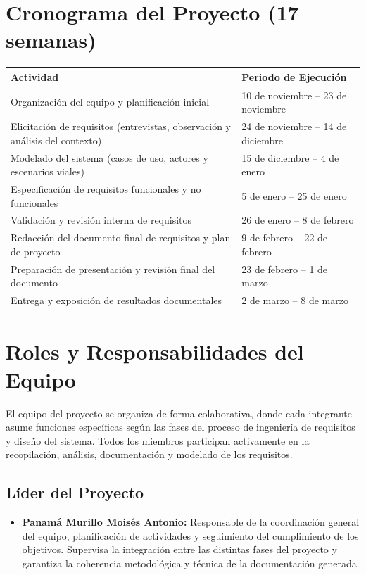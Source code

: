 \documentclass[12pt]{article}
\begin{document}
\section{Cronograma del Proyecto (17 semanas)}
\begin{longtable}{|p{10cm}|p{5cm}|}
\hline
\textbf{Actividad} & \textbf{Periodo de Ejecución} \\ \hline
Organización del equipo y planificación inicial & 10 de noviembre -- 23 de noviembre \\ \hline
Elicitación de requisitos (entrevistas, observación y análisis del contexto) & 24 de noviembre -- 14 de diciembre \\ \hline
Modelado del sistema (casos de uso, actores y escenarios viales) & 15 de diciembre -- 4 de enero \\ \hline
Especificación de requisitos funcionales y no funcionales & 5 de enero -- 25 de enero \\ \hline
Validación y revisión interna de requisitos & 26 de enero -- 8 de febrero \\ \hline
Redacción del documento final de requisitos y plan de proyecto & 9 de febrero -- 22 de febrero \\ \hline
Preparación de presentación y revisión final del documento & 23 de febrero -- 1 de marzo \\ \hline
Entrega y exposición de resultados documentales & 2 de marzo -- 8 de marzo \\ \hline
\end{longtable}

\section{Roles y Responsabilidades del Equipo}

El equipo del proyecto se organiza de forma colaborativa, donde cada integrante asume funciones específicas según las fases del proceso de ingeniería de requisitos y diseño del sistema. Todos los miembros participan activamente en la recopilación, análisis, documentación y modelado de los requisitos.

\subsection{Líder del Proyecto}
\begin{itemize}
    \item \textbf{Panamá Murillo Moisés Antonio:} Responsable de la coordinación general del equipo, planificación de actividades y seguimiento del cumplimiento de los objetivos. Supervisa la integración entre las distintas fases del proyecto y garantiza la coherencia metodológica y técnica de la documentación generada.
\end{itemize}
\end{document}
